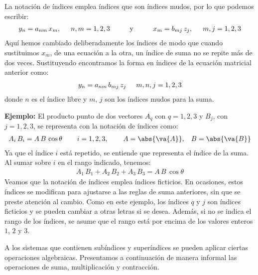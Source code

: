 La notación de índices emplea índices que son índices mudos, por lo que podemos escribir:
\begin{align*}
y_{n} = a_{nm} \, x_{m}, \hspace{0.5cm} n, m = 1, 2, 3 \hspace{1cm} \mbox{y} \hspace{1cm} x_{m} = b_{mj} \, z_{j}, \hspace{0.5cm} m, j = 1, 2, 3
\end{align*}
Aquí hemos cambiado deliberadamente los índices de modo que cuando sustituimos $x_{m}$, de una ecuación a la otra, un índice de suma no se repite más de dos veces. Sustituyendo encontramos la forma en índices de la ecuación matricial anterior como:
\begin{align*}
y_{n} = a_{nm} \, b_{mj} \, z_{j} \hspace{0.5cm} m, n, j = 1, 2, 3
\end{align*}
donde $n$ es el índice libre y $m$, $j$ son los índices mudos para la suma.
\par
\noindent
\textbf{Ejemplo: } El producto punto de dos vectores $A_{q}$ con $q = 1, 2, 3$ y $B_{j}$, con $j = 1, 2, 3$, se representa con la notación de índices como:
\begin{align*}
A_{i} \, B_{i} = A \, B \, \cos \theta \hspace{0.75cm} i = 1, 2, 3, \hspace{0.75cm} A = \abs{\va{A}}, \hspace{0.3cm} B = \abs{\va{B}}
\end{align*}
Ya que el índice $i$ está repetido, se entiende que representa el índice de la suma. Al sumar sobre $i$ en el rango indicado, tenemos:
\begin{align*}
A_{1} \, B_{1} + A_{2} \, B_{2} + A_{3} \, B_{3} = A \, B \, \cos \theta
\end{align*}
Veamos que la notación de índices emplea índices ficticios. En ocasiones, estos índices se modifican para ajustarse a las reglas de suma anteriores, sin que se preste atención al cambio. Como en este ejemplo, los índices $q$ y $j$ son índices ficticios y se pueden cambiar a otras letras si se desea. Además, si no se indica el rango de los índices, se asume que el rango está por encima de los valores enteros $1$, $2$ y $3$.
\par
A los sistemas que contienen subíndices y superíndices se pueden aplicar ciertas operaciones algebraicas. Presentamos a continuación de manera informal las operaciones de suma, multiplicación y contracción.

